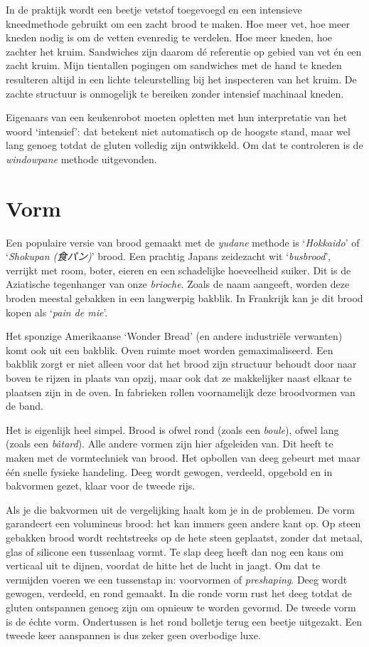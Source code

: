 \documentclass[
  11pt,
  dutch,
]{memoir}
\begin{document}
In de praktijk wordt een beetje vetstof toegevoegd en een intensieve
kneedmethode gebruikt om een zacht brood te maken. Hoe meer vet, hoe
meer kneden nodig is om de vetten evenredig te verdelen. Hoe meer
kneden, hoe zachter het kruim. Sandwiches zijn daarom dé referentie op
gebied van vet én een zacht kruim. Mijn tientallen pogingen om
sandwiches met de hand te kneden resulteren altijd in een lichte
teleurstelling bij het inspecteren van het kruim. De zachte structuur is
onmogelijk te bereiken zonder intensief machinaal kneden.

Eigenaars van een keukenrobot moeten opletten met hun interpretatie van
het woord `intensief': dat betekent niet automatisch op de hoogste
stand, maar wel lang genoeg totdat de gluten volledig zijn ontwikkeld.
Om dat te controleren is de \emph{windowpane} methode uitgevonden.

\hypertarget{vorm}{%
\section{Vorm}\label{vorm}}

Een populaire versie van brood gemaakt met de \emph{yudane} methode is
`\emph{Hokkaido}' of `\emph{Shokupan (食パン)}' brood. Een prachtig
Japans zeidezacht wit `\emph{busbrood}', verrijkt met room, boter,
eieren en een schadelijke hoeveelheid suiker. Dit is de Aziatische
tegenhanger van onze \emph{brioche}. Zoals de naam aangeeft, worden deze
broden meestal gebakken in een langwerpig bakblik. In Frankrijk kan je
dit brood kopen als `\emph{pain de mie}'.

Het sponzige Amerikaanse `Wonder Bread' (en andere industriële
verwanten) komt ook uit een bakblik. Oven ruimte moet worden
gemaximaliseerd. Een bakblik zorgt er niet alleen voor dat het brood
zijn structuur behoudt door naar boven te rijzen in plaats van opzij,
maar ook dat ze makkelijker naast elkaar te plaatsen zijn in de oven. In
fabrieken rollen voornamelijk deze broodvormen van de band.

Het is eigenlijk heel simpel. Brood is ofwel rond (zoals een
\emph{boule}), ofwel lang (zoals een \emph{bâtard}). Alle andere vormen
zijn hier afgeleiden van. Dit heeft te maken met de vormtechniek van
brood. Het opbollen van deeg gebeurt met maar één snelle fysieke
handeling. Deeg wordt gewogen, verdeeld, opgebold en in bakvormen gezet,
klaar voor de tweede rijs.

Als je die bakvormen uit de vergelijking haalt kom je in de problemen.
De vorm garandeert een volumineus brood: het kan immers geen andere kant
op. Op steen gebakken brood wordt rechtstreeks op de hete steen
geplaatst, zonder dat metaal, glas of silicone een tussenlaag vormt. Te
slap deeg heeft dan nog een kans om verticaal uit te dijnen, voordat de
hitte het de lucht in jaagt. Om dat te vermijden voeren we een
tussenstap in: voorvormen of \emph{preshaping}. Deeg wordt gewogen,
verdeeld, en rond gemaakt. In die ronde vorm rust het deeg totdat de
gluten ontspannen genoeg zijn om opnieuw te worden gevormd. De tweede
vorm is de échte vorm. Ondertussen is het rond bolletje terug een beetje
uitgezakt. Een tweede keer aanspannen is dus zeker geen overbodige luxe.
\end{document}
